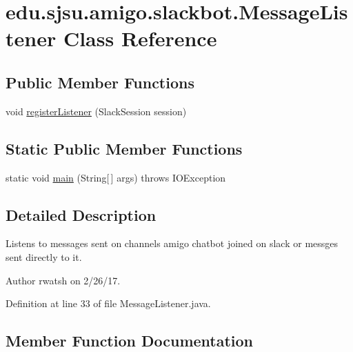 \hypertarget{classedu_1_1sjsu_1_1amigo_1_1slackbot_1_1_message_listener}{}\section{edu.\+sjsu.\+amigo.\+slackbot.\+Message\+Listener Class Reference}
\label{classedu_1_1sjsu_1_1amigo_1_1slackbot_1_1_message_listener}
\subsection*{Public Member Functions}
\begin{DoxyCompactItemize}
\item 
void \hyperlink{classedu_1_1sjsu_1_1amigo_1_1slackbot_1_1_message_listener_a1e02fd4fd7c7c34f764a6513c4ddf5bc}{register\+Listener} (Slack\+Session session)
\end{DoxyCompactItemize}
\subsection*{Static Public Member Functions}
\begin{DoxyCompactItemize}
\item 
static void \hyperlink{classedu_1_1sjsu_1_1amigo_1_1slackbot_1_1_message_listener_aad47f204592f42f9e483629b13c75b41}{main} (String\mbox{[}$\,$\mbox{]} args)  throws I\+O\+Exception     
\end{DoxyCompactItemize}


\subsection{Detailed Description}
Listens to messages sent on channels amigo chatbot joined on slack or messges sent directly to it.

\begin{DoxyAuthor}{Author}
rwatsh on 2/26/17. 
\end{DoxyAuthor}


Definition at line 33 of file Message\+Listener.\+java.



\subsection{Member Function Documentation}
\mbox{\label{classedu_1_1sjsu_1_1amigo_1_1slackbot_1_1_message_listener_aad47f204592f42f9e483629b13c75b41}} 
